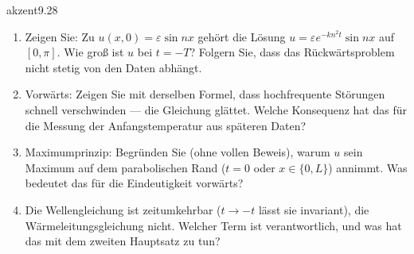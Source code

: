 \begin{karte}{akzent}{9.28}{\typstolper}{}
\begin{enumerate}[label=(\alph*),leftmargin=1.6em,itemsep=2pt]
\item Zeigen Sie: Zu $u(x, 0) = \varepsilon\sin nx$ gehört die Lösung $u = \varepsilon e^{-kn^{2}t}\sin nx$ auf $[0, \pi]$. Wie groß ist $u$ bei $t = -T$? Folgern Sie, dass das Rückwärtsproblem nicht stetig von den Daten abhängt.
\item Vorwärts: Zeigen Sie mit derselben Formel, dass hochfrequente Störungen schnell verschwinden --- die Gleichung glättet. Welche Konsequenz hat das für die Messung der Anfangstemperatur aus späteren Daten?
\item Maximumprinzip: Begründen Sie (ohne vollen Beweis), warum $u$ sein Maximum auf dem parabolischen Rand ($t = 0$ oder $x\in\{0, L\}$) annimmt. Was bedeutet das für die Eindeutigkeit vorwärts?
\item Die Wellengleichung ist zeitumkehrbar ($t\to-t$ lässt sie invariant), die Wärmeleitungsgleichung nicht. Welcher Term ist verantwortlich, und was hat das mit dem zweiten Hauptsatz zu tun?
\end{enumerate}
\end{karte}

